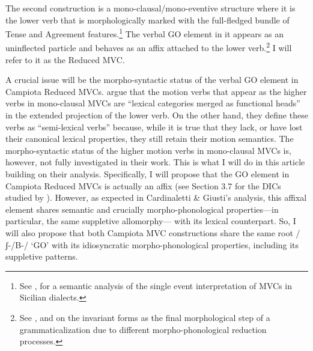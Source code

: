 \documentclass[output=paper]{langscibook}
\begin{document}
The second construction is a mono-clausal/mono-eventive structure where it is the lower verb that is morphologically marked with the full-fledged bundle of Tense and Agreement features.\footnote{See \cite{prete2020a}, \cite{todaro2018a} for a semantic analysis of the single event interpretation of MVCs in Sicilian dialects.}  The verbal GO element in it appears as an uninflected particle and behaves as an affix attached to the lower verb.\footnote{See \cite{cruschina2013a}, \cite{cruschina2021a} and \cite{ledgeway2016a} on the invariant forms as the final morphological step of a grammaticalization due to different morpho-phonological reduction processes.}  I will refer to it as the Reduced MVC.   

A crucial issue will be the morpho-syntactic status of the verbal GO element in Campiota Reduced MVCs. \cite{cardinaletti2003a} argue that the motion verbs that appear as the higher verbs in mono-clausal MVCs are “lexical categories merged as functional heads” in the extended projection of the lower verb. On the other hand, they define these verbs as “semi-lexical verbs” because, while it is true that they lack, or have lost their canonical lexical properties, they still retain their motion semantics. The morpho-syntactic status of the higher motion verbs in mono-clausal MVCs is, however, not fully investigated in their work.  This is what I will do in this article building on their analysis.  Specifically, I will propose that the GO element in Campiota Reduced MVCs is actually an affix (see Section 3.7 for the DICs studied by \cite{cardinaletti2003a}). However, as expected in Cardinaletti \& Giusti’s analysis, this affixal element shares semantic and crucially morpho-phonological properties—in particular, the same suppletive allomorphy— with its lexical counterpart.  So, I will also propose that both Campiota MVC constructions share the same root /ʃ-/B-/ ‘GO’ with its idiosyncratic morpho-phonological properties, including its suppletive patterns. 
\end{document}
